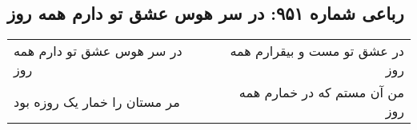 \begin{center}
\section*{رباعی شماره ۹۵۱: در سر هوس عشق تو دارم همه روز}
\label{sec:0951}
\begin{longtable}{l p{0.5cm} r}
در سر هوس عشق تو دارم همه روز
&&
در عشق تو مست و بیقرارم همه روز
\\
مر مستان را خمار یک روزه بود
&&
من آن مستم که در خمارم همه روز
\\
\end{longtable}
\end{center}
